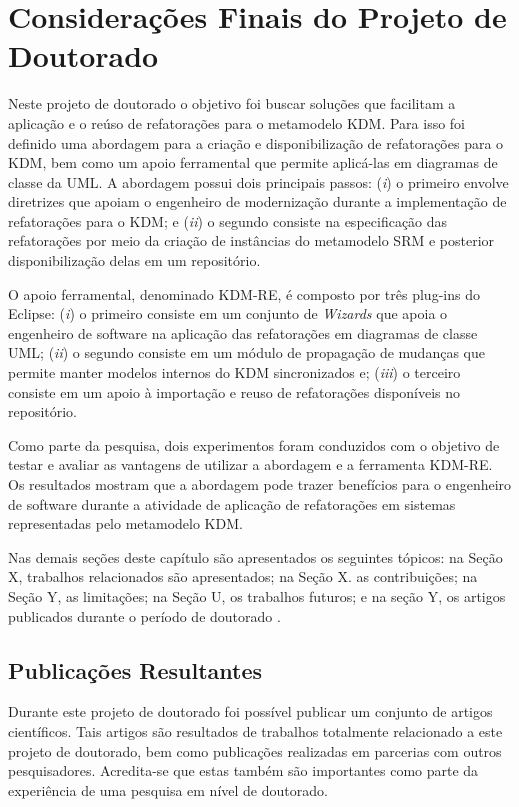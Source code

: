 \section{Considerações Finais do Projeto de Doutorado}

Neste projeto de doutorado o objetivo foi buscar soluções que facilitam a aplicação e o reúso de refatorações para o metamodelo KDM. Para isso foi definido uma abordagem para a criação e disponibilização de refatorações para o KDM, bem como um apoio ferramental que permite aplicá-las em diagramas de classe da UML. A abordagem possui dois principais passos: (\textit{i}) o primeiro envolve diretrizes que apoiam o engenheiro de modernização durante a implementação de refatorações para o KDM; e (\textit{ii}) o segundo consiste na especificação das refatorações por meio da criação de instâncias do metamodelo SRM e posterior disponibilização delas em um repositório.

O apoio ferramental, denominado KDM-RE, é composto por três plug-ins do Eclipse: (\textit{i}) o primeiro consiste em um conjunto de \textit{Wizards} que apoia o engenheiro de software na aplicação das refatorações em diagramas de classe UML; (\textit{ii}) o segundo consiste em um módulo de propagação de mudanças que permite manter modelos internos do KDM sincronizados e; (\textit{iii}) o terceiro consiste em um apoio à importação e reuso de refatorações disponíveis no repositório.

Como parte da pesquisa, dois experimentos foram conduzidos com o objetivo de testar e avaliar as vantagens de utilizar a abordagem e a ferramenta KDM-RE. Os resultados mostram que a abordagem pode trazer benefícios para o engenheiro de software durante a atividade de aplicação de refatorações em sistemas representadas pelo metamodelo KDM.

Nas demais seções deste capítulo são apresentados os seguintes tópicos: na Seção X, trabalhos relacionados são apresentados; na Seção X. as contribuições; na Seção Y, as limitações; na Seção U, os trabalhos futuros; e na seção Y, os artigos publicados durante o período de doutorado . 

\subsection{Publicações Resultantes}
Durante este projeto de doutorado foi possível publicar um conjunto de artigos científicos. Tais artigos são resultados de trabalhos totalmente relacionado a este projeto de doutorado, bem como publicações realizadas em parcerias com outros pesquisadores. Acredita-se que estas também são importantes como parte da experiência de uma pesquisa em nível de doutorado.

